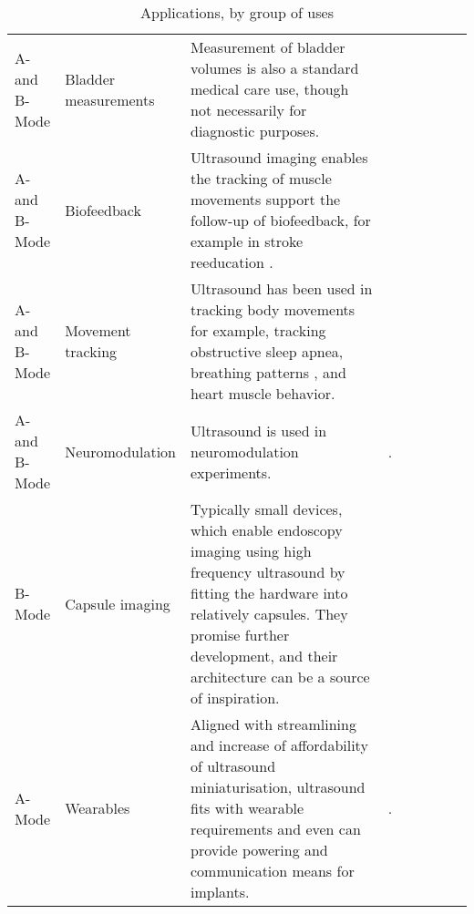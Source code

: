 \begin{table}[]
\begin{tabular}{p{0.1\linewidth} | p{0.15\linewidth} | p{0.50\linewidth} | p{0.25\linewidth} }
A- and B-Mode & Bladder measurements
& Measurement of bladder volumes is also a standard medical care use, though not necessarily for diagnostic purposes.
& \cite{kuru_feasibility_2019}  &  \\

A- and B-Mode & Biofeedback
& Ultrasound imaging enables the tracking of muscle movements support the follow-up of biofeedback, for example in stroke reeducation . & \cite{sosnowska_training_2019,sikdar_novel_2014}       &  \\

A- and B-Mode & Movement tracking 
& Ultrasound has been used in tracking body movements for example, tracking obstructive sleep apnea, breathing patterns , and heart muscle behavior.
& \cite{nguyen_estimating_2019,shahshahani_ultrasound_2018,weng_fpga-based_2015}  &  \\
              
A- and B-Mode & Neuromodulation                  & Ultrasound is used in neuromodulation experiments.
& \cite{pashaei_flexible_2020,johnson_stimdust_2018, seo_wireless_2016, santagati_design_2020}.       &  \\

B-Mode        & Capsule imaging                          & Typically small devices, which enable endoscopy imaging using high frequency ultrasound by fitting the hardware into relatively capsules. They promise further development, and their architecture can be a source of inspiration.  
& \cite{cox_ultrasound_2017, wang_development_2017,lee_towards_2014, memon_capsule_2016, lay_progress_2016, lay_-vivo_2018} &  \\

A-Mode        & Wearables                        & Aligned with streamlining and increase of affordability of ultrasound miniaturisation, ultrasound fits with wearable requirements and even can provide powering and communication means for implants.
& \cite{basak_wearable_2013,kou_real-time_2020}.       &  \\

\end{tabular}

\caption{Applications, by group of uses}
\label{tab:applications}

\end{table}